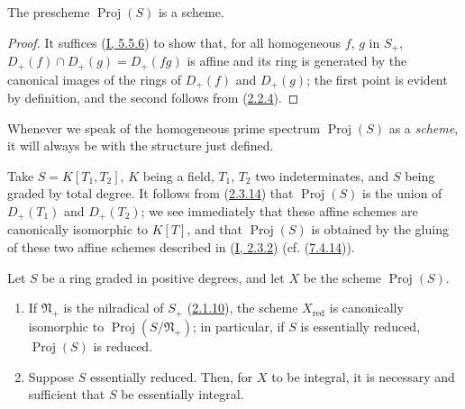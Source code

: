 \begin{proposition}[2.4.2]
\label{II.2.4.2}
The prescheme $\operatorname{Proj}(S)$ is a scheme.
\end{proposition}

\begin{proof}
It suffices (\hyperref[I.5.5.6]{I, 5.5.6}) to show that, for all
homogeneous $f$, $g$ in $S_+$,
$D_+(f)\cap D_+(g)=D_+(fg)$ is affine and its ring is generated by
the canonical images of the rings of $D_+(f)$ and $D_+(g)$; the first
point is evident by definition, and the second follows from
(\hyperref[II.2.2.4]{2.2.4}).
\end{proof}
Whenever we speak of the homogeneous prime spectrum $\operatorname{Proj}(S)$
as a \emph{scheme}, it will always be with the structure just
defined.

\begin{example}[2.4.3]
\label{II.2.4.3}
Take $S=K[T_1,T_2]$, $K$ being a field, $T_1$, $T_2$ two
indeterminates, and $S$ being graded by total degree. It follows from
(\hyperref[II.2.3.14]{2.3.14}) that $\operatorname{Proj}(S)$ is the
union of $D_+(T_1)$ and $D_+(T_2)$; we see immediately that these affine
schemes are canonically isomorphic to $K[T]$, and that
$\operatorname{Proj}(S)$ is obtained by the gluing of these two affine
schemes described in (\hyperref[I.2.3.2]{I, 2.3.2}) (cf.
(\hyperref[II.7.4.14]{7.4.14})).
\end{example}

\begin{proposition}[2.4.4]
\label{II.2.4.4}
Let $S$ be a ring graded in positive degrees, and let $X$ be the scheme
$\operatorname{Proj}(S)$.
\begin{enumerate}
  \item[\rm(i)] If $\mathfrak{N}_+$ is the nilradical of $S_+$
    (\hyperref[II.2.1.10]{2.1.10}), the scheme $X_{\mathrm{red}}$ is
    canonically isomorphic to $\operatorname{Proj}(S/\mathfrak{N}_+)$; in
    particular, if $S$ is essentially reduced,
    $\operatorname{Proj}(S)$ is reduced.
  \item[\rm(ii)] Suppose $S$ essentially reduced. Then, for $X$ to be
    integral, it is necessary and sufficient that $S$ be essentially
    integral.
\end{enumerate}
\end{proposition}

